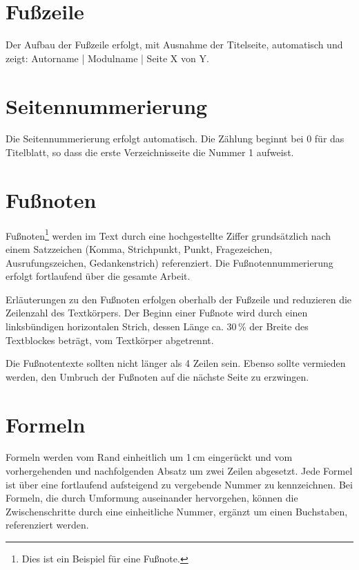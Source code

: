 \section{Fußzeile}
\label{sec:fusszeile}

Der Aufbau der Fußzeile erfolgt, mit Ausnahme der Titelseite, automatisch und zeigt: Autorname | Modulname | Seite X von Y.

\section{Seitennummerierung}
\label{sec:seitennummerierung}

Die Seitennummerierung erfolgt automatisch. Die Zählung beginnt bei 0 für das Titelblatt, so dass die erste Verzeichnisseite die Nummer 1 aufweist.

\section{Fußnoten}
\label{sec:fussnoten}

Fußnoten\footnote{Dies ist ein Beispiel für eine Fußnote.} werden im Text durch eine hochgestellte Ziffer grundsätzlich nach einem Satzzeichen (Komma, Strichpunkt, Punkt, Fragezeichen, Ausrufungszeichen, Gedankenstrich) referenziert. Die Fußnotennummerierung erfolgt fortlaufend über die gesamte Arbeit.

Erläuterungen zu den Fußnoten erfolgen oberhalb der Fußzeile und reduzieren die Zeilenzahl des Textkörpers. Der Beginn einer Fußnote wird durch einen linksbündigen horizontalen Strich, dessen Länge ca. 30\,\% der Breite des Textblockes beträgt, vom Textkörper abgetrennt.

Die Fußnotentexte sollten nicht länger als 4 Zeilen sein. Ebenso sollte vermieden werden, den Umbruch der Fußnoten auf die nächste Seite zu erzwingen.

\section{Formeln}
\label{sec:formeln}

Formeln werden vom Rand einheitlich um 1\,cm eingerückt und vom vorhergehenden und nachfolgenden Absatz um zwei Zeilen abgesetzt. Jede Formel ist über eine fortlaufend aufsteigend zu vergebende Nummer zu kennzeichnen. Bei Formeln, die durch Umformung auseinander hervorgehen, können die Zwischenschritte durch eine einheitliche Nummer, ergänzt um einen Buchstaben, referenziert werden.

